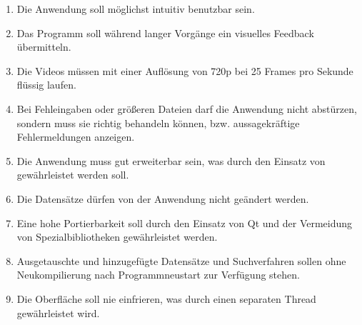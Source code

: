 \begin{enumerate} [label=\bfseries /NF \arabic*0/, leftmargin=*]
  \item Die Anwendung soll möglichst intuitiv benutzbar sein.
  \item Das Programm soll während langer Vorgänge ein visuelles Feedback übermitteln.
  \item Die Videos müssen mit einer Auflösung  von 720p bei 25 Frames pro Sekunde flüssig laufen.
  \item Bei Fehleingaben oder größeren Dateien darf die Anwendung nicht abstürzen, sondern muss sie richtig behandeln können, bzw. aussagekräftige Fehlermeldungen anzeigen.
  \item Die Anwendung muss gut erweiterbar sein, was durch den Einsatz von  gewährleistet werden soll.
  \item Die Datensätze dürfen von der Anwendung nicht geändert werden.
  \item Eine hohe Portierbarkeit soll durch den Einsatz von \gls{Qt} und der Vermeidung von Spezialbibliotheken gewährleistet werden.
  \item Ausgetauschte und hinzugefügte Datensätze und Suchverfahren sollen ohne Neukompilierung nach Programmneustart zur Verfügung stehen.
  \item Die Oberfläche soll nie einfrieren, was durch einen separaten Thread gewährleistet wird.
\end{enumerate}
\pagebreak
